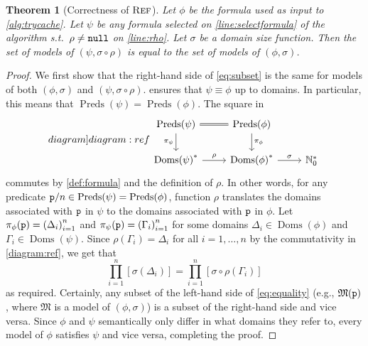 \documentclass{article}
\newtheorem{theorem}{Theorem}
\newcommand{\predicate}{\texttt{\textup{p}}}
\DeclareMathOperator{\Reff}{\textsc{Ref}}
\DeclareMathOperator{\Doms}{Doms}
\DeclareMathOperator{\Preds}{Preds}
\begin{document}
\begin{theorem}[Correctness of $\Reff$]
  Let $\phi$ be the formula used as input to \cref{alg:trycache}. Let $\psi$ be
  any formula selected on \cref{line:selectformula} of the algorithm s.t.\
  $\rho \ne {\normalfont\texttt{null}}$ on \cref{line:rho}. Let $\sigma$ be a
  domain size function. Then the set of models of $(\psi, \sigma \circ \rho)$ is
  equal to the set of models of $(\phi, \sigma)$.
\end{theorem}
\begin{proof}
  We first show that the right-hand side of \cref{eq:subset} is the same for
  models of both $(\phi, \sigma)$ and $(\psi, \sigma \circ \rho)$.
  \Cref{alg:trycache} ensures that $\psi \equiv \phi$ up to domains. In
  particular, this means that $\Preds(\psi) = \Preds(\phi)$. The square in
  \begin{equation}\label[diagram]{diagram:ref}
    \begin{tikzcd}
      \Preds(\psi) \ar[equal]{r} \ar[d, swap, "\pi_{\psi}"] & \Preds(\phi) \ar[d, "\pi_{\phi}"] \\
      {\Doms(\psi)}^{\ast} \ar[r, "\rho"] & {\Doms(\phi)}^{\ast} \ar[r, "\sigma"] & \mathbb{N}_{0}^{\ast}
    \end{tikzcd}
  \end{equation}
  commutes by \cref{def:formula} and the definition of $\rho$. In other words,
  for any predicate $\predicate/n \in \Preds(\psi) = \Preds(\phi)$, function
  $\rho$ translates the domains associated with $\predicate$ in $\psi$ to the
  domains associated with $\predicate$ in $\phi$. Let
  $\pi_{\phi}(\predicate) = {(\Delta_{i})}_{i=1}^{n}$ and
  $\pi_{\psi}(\predicate) = {(\Gamma_{i})}_{i=1}^{n}$ for some domains
  $\Delta_{i} \in \Doms(\phi)$ and $\Gamma_{i} \in \Doms(\psi)$. Since
  $\rho(\Gamma_{i}) = \Delta_{i}$ for all $i = 1, \dots, n$ by the commutativity
  in \cref{diagram:ref}, we get that
  \begin{equation}\label{eq:equality}
    \prod_{i=1}^{n}[\sigma(\Delta_{i})] = \prod_{i=1}^{n}[\sigma \circ \rho(\Gamma_{i})]
  \end{equation}
  as required. Certainly, any subset of the left-hand side of \cref{eq:equality}
  (e.g., $\mathfrak{M}(\predicate)$, where $\mathfrak{M}$ is a model of
  $(\phi, \sigma)$) is a subset of the right-hand side and vice versa. Since
  $\phi$ and $\psi$ semantically only differ in what domains they refer to,
  every model of $\phi$ satisfies $\psi$ and vice versa, completing the proof.
\end{proof}
\end{document}
